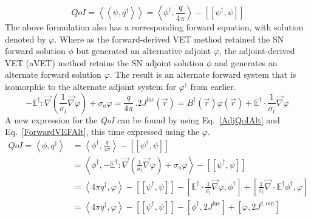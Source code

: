 \documentclass[12pt]{report}
\newcommand{\vr}{\vec{r}}
\newcommand{\bra}{\left\langle}
\newcommand{\ket}{\right\rangle}
\newcommand{\braSN}{\left\langle \! \left\langle}
\newcommand{\ketSN}{\right\rangle \! \right\rangle}
\newcommand{\sbraSN}{\left[ \! \left[}
\newcommand{\sketSN}{\right] \! \right]}
\newcommand{\sbra}{\left[}
\newcommand{\sket}{\right]}
\renewcommand{\div}{\vec{\nabla} \cdot}
\newcommand{\grad}{\vec{\nabla}}
\newcommand{\Edd}{\mathbb{E}}
\newcommand{\BEdd}{B}
\newcommand{\sigt}{\sigma_t}
\newcommand{\siga}{\sigma_a}
\newcommand{\angSource}{\frac{q}{4 \pi}}
\newcommand{\scalResp}{q^\dag}
\newcommand{\qoi}{{\it QoI}\xspace}
\begin{document}
\begin{equation}
\label{AdjQoIAlt}
QoI = \braSN \psi , \scalResp\ketSN = \bra \phi^\dag , \angSource \ket - \sbraSN \psi^\dag,  \psi \sketSN 
\end{equation}
The above formulation also has a corresponding forward equation, with solution denoted by $\varphi$. Where as the forward-derived VET method retained the SN forward solution $\phi$ but generated an alternative adjoint $\varphi$, the adjoint-derived VET (aVET) method retains the SN adjoint solution $\phi$ and generates an alternate forward solution $\varphi$. The result is an alternate forward system that is isomorphic to the alternate adjoint system for $\varphi^\dag$ from earlier.
\begin{subequations}
\begin{equation}
\label{ForwardVEFAlt}
- \Edd^\dag : \grad \left( \frac{1}{\sigt}\grad \varphi \right) + \siga \varphi  = \angSource  \,.
\end{equation}
\begin{equation}
2 J^{\text{inc}}(\vr) = \BEdd^\dag(\vr) \varphi(\vr) + \Edd^\dag \cdot \frac{1}{\sigt} \grad \varphi  \,
\end{equation} 
\end{subequations}
A new expression for the \qoi can be found by using Eq.~\eqref{AdjQoIAlt} and Eq.~\eqref{ForwardVEFAlt}, this time expressed using the $\varphi$.
 \begin{equation}
\label{AdjQoIAltExpand}
\begin{split}
QoI = \bra \phi , \scalResp \ket &= \bra \phi^\dag , \angSource \ket - \sbraSN \psi^\dag,  \psi \sketSN \\
&= \bra \phi^\dag , - \Edd^\dag : \grad \left( \frac{1}{\sigt}\grad \varphi \right) + \siga \varphi \ket - \sbraSN \psi^\dag,  \psi \sketSN \\
&= \bra 4\pi \scalResp  ,\varphi \ket - \sbraSN \psi^\dag,  \psi \sketSN  
- \sbra \Edd^\dag \cdot \frac{1}{\sigt}\grad \varphi,  \phi^\dag \sket 
+ \sbra \frac{1}{\sigt} \div \Edd^\dag \phi^\dag,  \varphi \sket \\
&=  \bra 4\pi \scalResp  ,\varphi \ket - \sbraSN \psi^\dag,  \psi \sketSN - \sbra \phi^\dag, 2J^{\text{inc}} \sket + \sbra \varphi , 2 J^{\dag,\text{out}} \sket
\end{split}
\end{equation}
\end{document}
